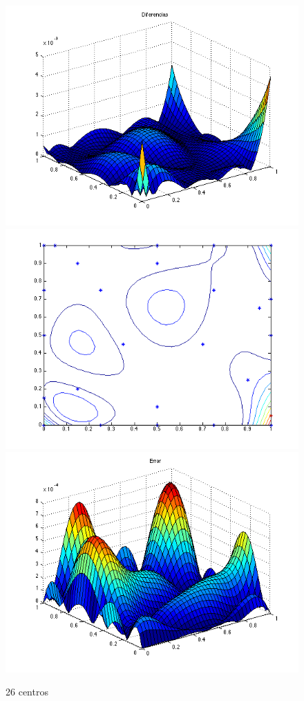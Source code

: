 \documentclass[11pt,a4paper]{article}
\begin{document}
\begin{figure}[H]
\centering

\includegraphics[scale=0.35]{diferencias26.png}
\includegraphics[scale=0.35]{centros26.png}
\includegraphics[scale=0.35]{error26.png}
\caption{26 centros}
\end{figure}
\end{document}
